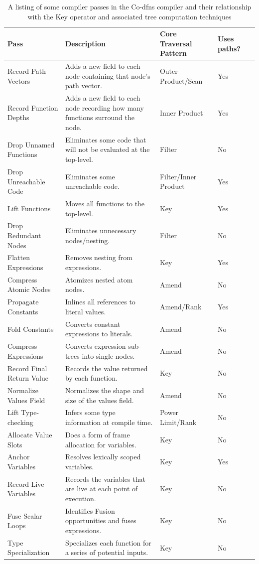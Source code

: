 ﻿\documentclass[numbers,10pt,preprint]{sigplanconf}
\begin{document}
\begin{table}
\centering
\begin{tabular}{l p{2.8in} l l l}
\toprule
Pass & Description & Core Traversal Pattern & Uses paths? \\
\midrule
Record Path Vectors & Adds a new field to each node containing that node's 
 path vector. & Outer Product/Scan & Yes \\
Record Function Depths & Adds a new field to each node recording how many 
 functions surround the node. & Inner Product & Yes \\
Drop Unnamed Functions & Eliminates some code that will not be evaluated at 
 the top-level. & Filter & No \\
Drop Unreachable Code & Eliminates some unreachable code. &
 Filter/Inner Product & Yes \\
Lift Functions & Moves all functions to the top-level. & Key & Yes \\
Drop Redundant Nodes & Eliminates unnecessary nodes/nesting. & Filter & No \\
Flatten Expressions & Removes nesting from expressions. & Key & Yes \\
Compress Atomic Nodes & Atomizes nested atom nodes. & Amend & No \\
Propagate Constants & Inlines all references to literal values. &
 Amend/Rank & Yes \\
Fold Constants & Converts constant expressions to literals. & Amend & No \\
Compress Expressions & Converts expression sub-trees into single nodes. & 
 Amend & No \\
Record Final Return Value & Records the value returned by each function. & 
 Key & No \\
Normalize Values Field & Normalizes the shape and size of the values field. &
 Amend & No \\
Lift Type-checking & Infers some type information at compile time. &
 Power Limit/Rank & No \\
Allocate Value Slots & Does a form of frame allocation for variables. &
 Key & No \\
Anchor Variables & Resolves lexically scoped variables. &
 Key & Yes \\
Record Live Variables & Records the variables that are live at each point of 
 execution. & Key & No \\
Fuse Scalar Loops & Identifies Fusion opportunities and fuses expressions. &
 Key & No \\
Type Specialization & Specializes each function for a series of potential inputs. 
 & Key & No \\
\end{tabular}
\caption{A listing of some compiler passes in the Co-dfns compiler and their 
 relationship with the Key operator and associated tree computation techniques}
\label{tab:passes}
\end{table}
\end{document}

